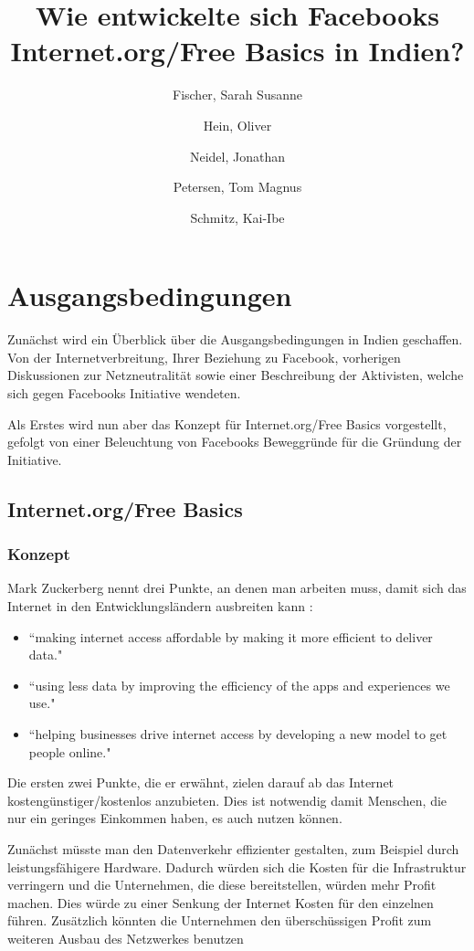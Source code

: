 \documentclass{article}
\title{Wie entwickelte sich Facebooks Internet.org/Free Basics in Indien?}
\author{
  Fischer, Sarah Susanne\\
  \and
  Hein, Oliver\\
  \and
  Neidel, Jonathan\\
  \and
  Petersen, Tom Magnus\\
  \and
  Schmitz, Kai-Ibe\\
}
\begin{document}
\maketitle

\section{Ausgangsbedingungen}

Zunächst wird ein Überblick über die Ausgangsbedingungen in Indien geschaffen. Von der Internetverbreitung, Ihrer Beziehung zu Facebook, vorherigen Diskussionen zur Netzneutralität sowie einer Beschreibung der Aktivisten, welche sich gegen Facebooks Initiative wendeten.

Als Erstes wird nun aber das Konzept für Internet.org/Free Basics vorgestellt, gefolgt von einer Beleuchtung von Facebooks Beweggründe für die Gründung der Initiative.

\subsection{Internet.org/Free Basics}

\subsubsection{Konzept}
        
Mark Zuckerberg nennt drei Punkte, an denen man arbeiten muss, damit sich das Internet in den Entwicklungsländern ausbreiten kann
\parencite{HumanRight}:
\begin{itemize}
\item ``making internet access affordable by making it more efficient to deliver data."

\item ``using less data by improving the efficiency of the apps and experiences we use."

\item ``helping businesses drive internet access by developing a new model to get people online."  
\end{itemize}

Die ersten zwei Punkte, die er erwähnt, zielen darauf ab das Internet kostengünstiger/kostenlos anzubieten. 
Dies ist notwendig damit Menschen, die nur ein geringes Einkommen haben, es auch nutzen können.
\medskip

Zunächst müsste man den Datenverkehr effizienter gestalten, zum Beispiel durch leistungsfähigere Hardware.
Dadurch würden sich die Kosten für die Infrastruktur verringern und die Unternehmen, die diese bereitstellen, würden mehr Profit    
machen. Dies würde zu einer Senkung der Internet Kosten für den einzelnen führen.
Zusätzlich könnten die Unternehmen den überschüssigen Profit zum weiteren Ausbau des Netzwerkes benutzen\\
\end{document}
